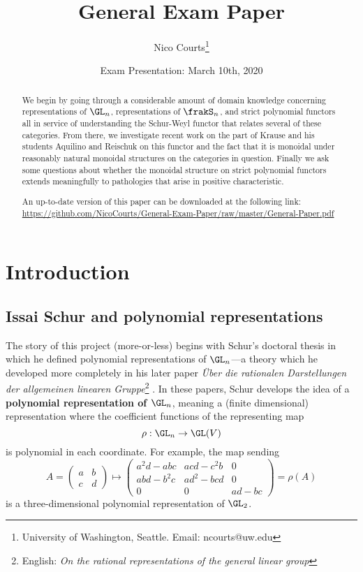 \documentclass[12pt]{article}
\begin{document}
\title{General Exam Paper \vspace{-1ex}}
\author{Nico Courts\footnote{University of Washington, Seattle. Email: ncourts@uw.edu}}
\date{Exam Presentation: March 10th, 2020}
\maketitle

\begin{abstract}
	We begin by going through a considerable amount of domain knowledge concerning representations of $\GL_n$,
	representations of $\frakS_n$, and strict polynomial functors all in service of understanding the Schur-Weyl 
	functor that relates several of these categories. From there, we investigate recent work on the part of Krause 
	and his students Aquilino and Reischuk on this functor and the fact that it is monoidal under reasonably natural monoidal structures on 
	the categories in question. Finally we ask some questions about whether the monoidal structure on strict polynomial functors 
	extends meaningfully to pathologies that arise in positive characteristic.

	{\footnotesize An up-to-date version of this paper can be downloaded at the following link: \url{https://github.com/NicoCourts/General-Exam-Paper/raw/master/General-Paper.pdf}}
\end{abstract}

\newpage
\tableofcontents

\newpage
\section{Introduction}
\subsection{Issai Schur and polynomial representations}
The story of this project (more-or-less) begins with Schur's doctoral thesis \cite{schur-thesis} in which he defined
polynomial representations of $\GL_n$---a theory which he developed more completely in his later paper \textit{\"Uber die 
rationalen Darstellungen der allgemeinen linearen Gruppe}\footnote{English: \textit{On the rational representations of the general linear group}}
\cite{schur-rational}. In these papers, Schur develops the idea of a \textbf{polynomial representation of $\GL_n$},
meaning a (finite dimensional) representation where the coefficient functions of the representing map 
\[\rho:\GL_n\to \GL(V)\]
is polynomial in each coordinate. For example, the map sending 
\[A=\begin{pmatrix}
	a&b\\
	c&d
\end{pmatrix}\mapsto \begin{pmatrix}
	a^2d-abc & acd-c^2b & 0\\
	abd-b^2c & ad^2-bcd & 0\\
	0 & 0 & ad-bc
\end{pmatrix}=\rho(A)\]
is a three-dimensional polynomial representation of $\GL_2$.
\end{document}
